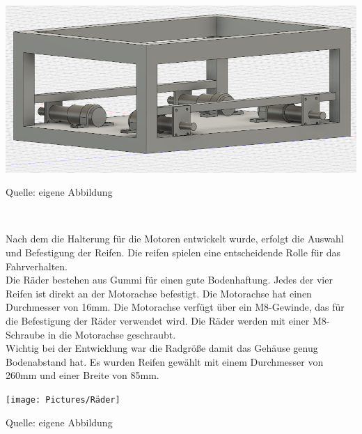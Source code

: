 \documentclass[ngerman,12pt,a4paper]{article}
\begin{document}
		\begin{center} 
			\begin{minipage}[t]{0.7\textwidth}
				\includegraphics{Pictures/Halterung-Motoren}
				\label{fig:Motorenhalterung}
				\vspace{-10pt}
				\begin{center}
					\par\small Quelle: eigene Abbildung 
				\end{center}
			\end{minipage} \\[2cm]
		\end{center}
		Nach dem die Halterung für die Motoren entwickelt wurde, erfolgt die Auswahl und Befestigung der Reifen. Die reifen spielen eine entscheidende Rolle für das Fahrverhalten. \\[0.5cm]
		Die Räder bestehen aus Gummi für einen gute Bodenhaftung. Jedes der vier Reifen ist direkt an der Motorachse befestigt. Die Motorachse hat einen Durchmesser von 16mm. Die Motorachse verfügt über ein M8-Gewinde, das für die Befestigung der Räder verwendet wird. Die Räder werden mit einer M8-Schraube in die Motorachse geschraubt.\\[0.5cm]
		Wichtig bei der Entwicklung war die Radgröße damit das Gehäuse genug Bodenabstand hat. Es wurden Reifen gewählt mit einem Durchmesser von 260mm und einer Breite von 85mm.\\
		\begin{center} 
			\begin{minipage}[t]{0.7\textwidth}
				\texttt{[image: Pictures/Räder]}
				\label{fig:Räder}
				\vspace{-10pt}
				\begin{center}
					\par\small Quelle: eigene Abbildung 
				\end{center}
			\end{minipage} \\[0.75cm]
		\end{center}
\end{document}
